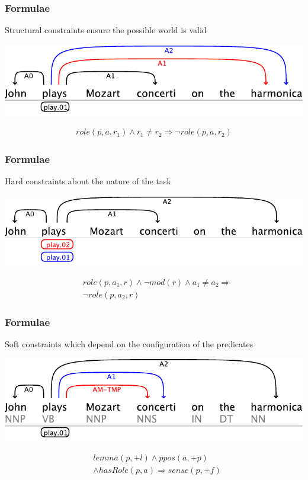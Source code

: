 \documentclass{beamer}
\begin{document}
\begin{frame}
    \frametitle{Formulae}

    Structural constraints ensure the possible world is valid

    \begin{center}
        \includegraphics[scale=.70]{example-2}
    \end{center}
 
 \begin{eqnarray*}
    role(p,a,r_1) \wedge r_1 \neq r_2 \Rightarrow \neg role(p,a,r_2) 
 \end{eqnarray*}


\end{frame}


\begin{frame}
    \frametitle{Formulae}
    Hard constraints about the nature of the task
    \begin{center}
        \includegraphics[scale=.70]{example-1}
    \end{center}

 \begin{eqnarray*}
 &role\left(p,a_{1},r\right)\wedge \neg mod\left(r\right)\wedge a_{1}\neq a_{2}  \Rightarrow\\
  & \neg role\left(p,a_{2},r\right)
 \end{eqnarray*}


\end{frame}


\begin{frame}
    \frametitle{Formulae}
    Soft constraints which depend on the configuration of the predicates 
    \begin{center}
        \includegraphics[scale=.70]{example-3}
    \end{center}

 \begin{eqnarray*}
  & lemma(p,+l) \wedge ppos(a,+p)  \\
  & \wedge hasRole(p,a)  \Rightarrow sense(p,+f) 
 \end{eqnarray*}
\end{frame}
\end{document}

